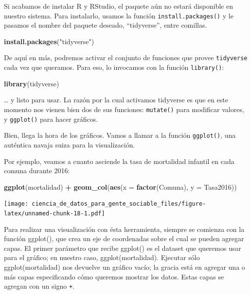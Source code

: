 \documentclass[]{book}
\newenvironment{Shaded}{\begin{snugshade}}{\end{snugshade}}
\newcommand{\KeywordTok}[1]{\textcolor[rgb]{0.13,0.29,0.53}{\textbf{#1}}}
\newcommand{\DataTypeTok}[1]{\textcolor[rgb]{0.13,0.29,0.53}{#1}}
\newcommand{\StringTok}[1]{\textcolor[rgb]{0.31,0.60,0.02}{#1}}
\newcommand{\OperatorTok}[1]{\textcolor[rgb]{0.81,0.36,0.00}{\textbf{#1}}}
\newcommand{\NormalTok}[1]{#1}
\begin{document}
Si acabamos de instalar R y RStudio, el paquete aún no estará disponible
en nuestro sistema. Para instalarlo, usamos la función
\texttt{install.packages()} y le pasamos el nombre del paquete deseado,
``tidyverse'', entre comillas.

\begin{Shaded}
\begin{Highlighting}[]
\KeywordTok{install.packages}\NormalTok{(}\StringTok{"tidyverse"}\NormalTok{)}
\end{Highlighting}
\end{Shaded}

De aquí en más, podremos activar el conjunto de funciones que provee
\texttt{tidyverse} cada vez que queramos. Para eso, lo invocamos con la
función \texttt{library()}:

\begin{Shaded}
\begin{Highlighting}[]
\KeywordTok{library}\NormalTok{(tidyverse)}
\end{Highlighting}
\end{Shaded}

\ldots{} y listo para usar. La razón por la cual activamos tidyverse es
que en este momento nos vienen bien dos de sus funciones:
\texttt{mutate()} para modificar valores, y \texttt{ggplot()} para hacer
gráficos.

Bien, llega la hora de los gráficos. Vamos a llamar a la función
\texttt{ggplot()}, una auténtica navaja suiza para la visualización.

Por ejemplo, veamos a cuanto asciende la tasa de mortalidad infantil en
cada comuna durante 2016:

\begin{Shaded}
\begin{Highlighting}[]
\KeywordTok{ggplot}\NormalTok{(mortalidad) }\OperatorTok{+}
\StringTok{    }\KeywordTok{geom_col}\NormalTok{(}\KeywordTok{aes}\NormalTok{(}\DataTypeTok{x =} \KeywordTok{factor}\NormalTok{(Comuna), }\DataTypeTok{y =}\NormalTok{ Tasa2016))}
\end{Highlighting}
\end{Shaded}

\texttt{[image: ciencia\_de\_datos\_para\_gente\_sociable\_files/figure-latex/unnamed-chunk-18-1.pdf]}

Para realizar una visualización con ésta herramienta, siempre se
comienza con la función ggplot(), que crea un eje de coordenadas sobre
el cual se pueden agregar capas. El primer parámetro que recibe ggplot()
es el dataset que queremos usar para el gráfico; en nuestro caso,
ggplot(mortalidad). Ejecutar sólo ggplot(mortalidad) nos devuelve un
gráfico vacío; la gracia está en agregar una o más capas especificando
cómo queremos mostrar los datos. Estas capas se agregan con un signo
\texttt{+}.
\end{document}
